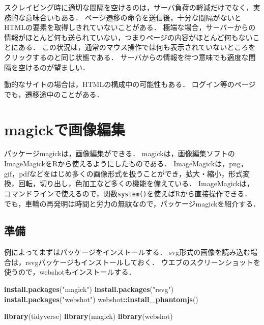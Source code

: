 \documentclass[
]{article}
\newenvironment{Shaded}{\begin{snugshade}}{\end{snugshade}}
\newcommand{\FunctionTok}[1]{\textcolor[rgb]{0.13,0.29,0.53}{\textbf{#1}}}
\newcommand{\NormalTok}[1]{#1}
\newcommand{\SpecialCharTok}[1]{\textcolor[rgb]{0.81,0.36,0.00}{\textbf{#1}}}
\newcommand{\StringTok}[1]{\textcolor[rgb]{0.31,0.60,0.02}{#1}}
\begin{document}
スクレイピング時に適切な間隔を空けるのは，サーバ負荷の軽減だけでなく，実務的な意味合いもある．
ページ遷移の命令を送信後，十分な間隔がないとHTMLの要素を取得しきれていないことがある．
極端な場合，サーバーからの情報がほとんど何も送られていない，つまりページの内容がほとんど何もないことにある．
この状況は，通常のマウス操作では何も表示されていないところをクリックするのと同じ状態である．
サーバからの情報を待つ意味でも適度な間隔を空けるのが望ましい．

動的なサイトの場合は，HTMLの構成中の可能性もある．
ログイン等のページでも，遷移途中のことがある．

\hypertarget{magick}{%
\section{magickで画像編集}\label{magick}}

パッケージmagickは，画像編集ができる．
magickは，画像編集ソフトのImageMagickをRから使えるようにしたものである．
ImageMagickは，png，gif，pdfなどをはじめ多くの画像形式を扱うことができ，拡大・縮小，形式変換，回転，切り出し，色加工など多くの機能を備えている．
ImageMagickは，コマンドラインで使えるので，関数\texttt{system()}を使えばRから直接操作できる．
でも，車輪の再発明は時間と労力の無駄なので，パッケージmagickを紹介する．

\hypertarget{ux6e96ux5099-12}{%
\subsection{準備}\label{ux6e96ux5099-12}}

例によってまずはパッケージをインストールする．
svg形式の画像を読み込む場合は，rsvgパッケージもインストールしておく．
ウエブのスクリーンショットを使うので，webshotもインストールする．

\begin{Shaded}
\begin{Highlighting}[]
\FunctionTok{install.packages}\NormalTok{(}\StringTok{"magick"}\NormalTok{)}
\FunctionTok{install.packages}\NormalTok{(}\StringTok{"rsvg"}\NormalTok{)}
\FunctionTok{install.packages}\NormalTok{(}\StringTok{"webshot"}\NormalTok{)}
\NormalTok{webshot}\SpecialCharTok{::}\FunctionTok{install\_phantomjs}\NormalTok{()}
\end{Highlighting}
\end{Shaded}

\begin{Shaded}
\begin{Highlighting}[]
\FunctionTok{library}\NormalTok{(tidyverse)}
\FunctionTok{library}\NormalTok{(magick)}
\FunctionTok{library}\NormalTok{(webshot)}
\end{Highlighting}
\end{Shaded}
\end{document}
